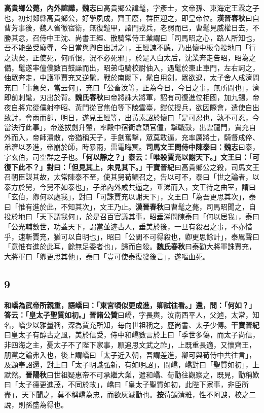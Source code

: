 \textbf{高貴鄉公薨，內外諠譁，}{\footnotesize \textbf{魏志}曰高貴鄉公諱髦，字彥士，文帝孫、東海定王霖之子也，初封郯縣高貴鄉公，好學夙成，齊王廢，群臣迎之，即皇帝位。\textbf{漢晉春秋}曰自曹芳事後，魏人省徹宿衛，無復鎧甲，諸門戎兵，老弱而已，曹髦見威權日去，不勝其忿，召侍中王沈、尚書王經、散騎常侍王業謂曰「司馬昭之心，路人所知也，吾不能坐受廢辱，今日當與卿自出討之」，王經諫不聽，乃出懷中板令投地曰「行之決矣，正使死，何所恨，況不必死邪」，於是入白太后，沈業奔走告昭，昭為之備，髦遂率僮僕數百鼓譟而出，昭弟屯騎校尉伷入，遇髦於東止車門，左右訶之，伷眾奔走，中護軍賈充又逆髦，戰於南闕下，髦自用劍，眾欲退，太子舍人成濟問充曰「事急矣，當云何」，充曰「公畜汝等，正為今日，今日之事，無所問也」，濟即前刺髦，刃出於背。\textbf{魏氏春秋}曰帝將誅大將軍，詔有司復進位相國，加九錫，帝夜自將宂從僕射李昭、黃門從官焦伯等下陵雲臺，鎧仗授兵，欲因際會，遣使自出致討，會雨而卻，明日，遂見王經等，出黃素詔於懷曰「是可忍也，孰不可忍，今當決行此事」，帝遂拔劍升輦，率殿中宿衛倉頭官僮，撃戰鼓，出雲龍門，賈充自外而入，帝師潰散，帝猶稱天子，手劍奮撃，眾莫敢逼，充率厲將士，騎督成倅、弟濟以矛進，帝崩於師，時暴雨，雷電晦冥。}\textbf{司馬文王問侍中陳泰曰：}{\footnotesize \textbf{魏志}曰泰，字玄伯，司空群之子也。}\textbf{「何以靜之？」泰云：「唯殺賈充以謝天下。」文王曰：「可復下此不？」對曰：「但見其上，未見其下。」}{\footnotesize \textbf{干寶晉紀}曰高貴鄉公之殺，司馬文王召朝臣謀其故，太常陳泰不至，使其舅荀顗召之，告以可不，泰曰「世之論者，以泰方於舅，今舅不如泰也」，子弟內外咸共逼之，垂涕而入，文王待之曲室，謂曰「玄伯，卿何以處我」，對曰「可誅賈充以謝天下」，文王曰「為吾更思其次」，泰曰「惟有進於此，不知其次」，文王乃止。\textbf{漢晉春秋}曰曹髦之薨，司馬昭聞之，自投於地曰「天下謂我何」，於是召百官議其事，昭垂涕問陳泰曰「何以居我」，泰曰「公光輔數世，功蓋天下，謂當並迹古人，垂美於後，一旦有殺君之事，不亦惜乎，速斬賈充，猶可以自明也」，昭曰「公閭不可得殺也，卿更思餘計」，泰厲聲曰「意惟有進於此耳，餘無足委者也」，歸而自殺。\textbf{魏氏春秋}曰泰勸大將軍誅賈充，大將軍曰「卿更思其他」，泰曰「豈可使泰復發後言」，遂嘔血死。}

\subsection*{9}

\textbf{和嶠為武帝所親重，語嶠曰：「東宮頃似更成進，卿試往看。」還，問：「何如？」答云：「皇太子聖質如初。」}{\footnotesize \textbf{晉諸公贊}曰嶠，字長輿，汝南西平人，父逌，太常，知名，嶠少以雅量稱，深為賈充所知，毎向世祖稱之，歷尚書、太子少傅。\textbf{干寶晉紀}曰皇太子有醇古之風，美於信受，侍中和嶠數言於上曰「季世多偽，而太子尚信，非四海之主，憂太子不了陛下家事，願追思文武之祚」，上既重長適，又懷齊王，朋黨之論弗入也，後上謂嶠曰「太子近入朝，吾謂差進，卿可與荀侍中共往言」，及顗奉詔還，對上曰「太子明識弘新，有如明詔」，問嶠，嶠對曰「聖質如初」，上默然。\textbf{晉陽秋}曰世祖疑惠帝不可承繼大業，遣和嶠、荀勖往觀察之，既見，勖稱歎曰「太子德更進茂，不同於故」，嶠曰「皇太子聖質如初，此陛下家事，非臣所盡」，天下聞之，莫不稱嶠為忠，而欲灰滅勖也。\textbf{按}荀顗清雅，性不阿諛，校之二說，則孫盛為得也。}

